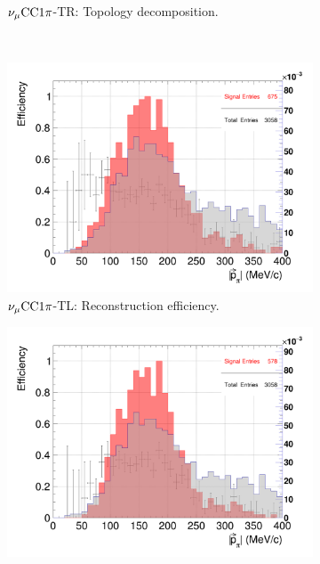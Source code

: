 \begin{figure}[ht]
\begin{subfigure}{\dbfigwid\textwidth}
                    \caption{$\nu_{\mu}\textrm{CC}1\pi$-TR: Topology decomposition.}
                    \label{subfig:stack-topo-tr}
               \end{subfigure}
               \\
               \begin{subfigure}{\dbfigwid\textwidth}
                    \includegraphics[width=\textwidth]{figures/sel/p_pi_eff_al10_TL.png}
                    \caption{$\nu_{\mu}\textrm{CC}1\pi$-TL: Reconstruction efficiency.}
                    \label{subfig:ppi-eff-tl}
               \end{subfigure}
               \begin{subfigure}{\dbfigwid\textwidth}
                    \includegraphics[width=\textwidth]{figures/sel/p_pi_eff_al9_TR.png}

\end{subfigure}
\end{figure}
